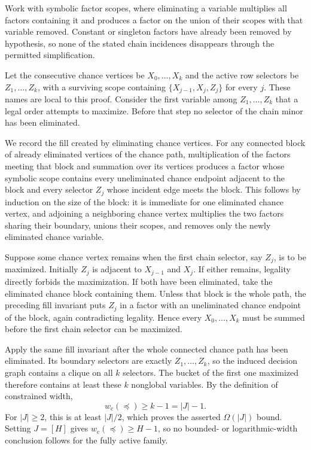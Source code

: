 Work with symbolic factor scopes, where eliminating a variable multiplies all factors containing it and produces a factor on the union of their scopes with that variable removed.  Constant or singleton factors have already been removed by hypothesis, so none of the stated chain incidences disappears through the permitted simplification.

Let the consecutive chance vertices be \(X_0,\ldots,X_k\) and the active row selectors be \(Z_1,\ldots,Z_k\), with a surviving scope containing \(\{X_{j-1},X_j,Z_j\}\) for every \(j\).  These names are local to this proof.  Consider the first variable among \(Z_1,\ldots,Z_k\) that a legal order attempts to maximize.  Before that step no selector of the chain minor has been eliminated.

We record the fill created by eliminating chance vertices.  For any connected block of already eliminated vertices of the chance path, multiplication of the factors meeting that block and summation over its vertices produces a factor whose symbolic scope contains every uneliminated chance endpoint adjacent to the block and every selector \(Z_j\) whose incident edge meets the block.  This follows by induction on the size of the block: it is immediate for one eliminated chance vertex, and adjoining a neighboring chance vertex multiplies the two factors sharing their boundary, unions their scopes, and removes only the newly eliminated chance variable.

Suppose some chance vertex remains when the first chain selector, say \(Z_j\), is to be maximized.  Initially \(Z_j\) is adjacent to \(X_{j-1}\) and \(X_j\).  If either remains, legality directly forbids the maximization.  If both have been eliminated, take the eliminated chance block containing them.  Unless that block is the whole path, the preceding fill invariant puts \(Z_j\) in a factor with an uneliminated chance endpoint of the block, again contradicting legality.  Hence every \(X_0,\ldots,X_k\) must be summed before the first chain selector can be maximized.

Apply the same fill invariant after the whole connected chance path has been eliminated.  Its boundary selectors are exactly \(Z_1,\ldots,Z_k\), so the induced decision graph contains a clique on all \(k\) selectors.  The bucket of the first one maximized therefore contains at least these \(k\) nonglobal variables.  By the definition of constrained width,
\[
 w_{\mathrm c}(\preceq)\ge k-1=|J|-1.
\]
For \(|J|\ge2\), this is at least \(|J|/2\), which proves the asserted \(\Omega(|J|)\) bound.  Setting \(J=[H]\) gives \(w_{\mathrm c}(\preceq)\ge H-1\), so no bounded- or logarithmic-width conclusion follows for the fully active family.